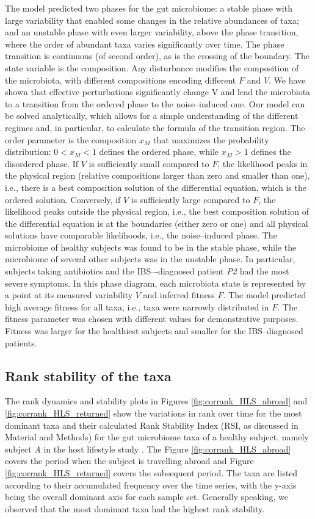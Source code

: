 The model predicted two phases for the gut microbiome: a stable phase with large variability that enabled some changes in the relative abundances of taxa; and an unstable phase with even larger variability, above the phase transition, where the order of abundant taxa varies significantly over time. The phase transition is continuous (of second order), as is the crossing of the boundary. The state variable is the composition. Any disturbance modifies the composition of the microbiota, with different compositions encoding different $F$ and $V$. We have shown that effective perturbations significantly change V and lead the microbiota to a transition from the ordered phase to the noise--induced one. Our model can be solved analytically, which allows for a simple understanding of the different regimes and, in particular, to calculate the formula of the transition region. The order parameter is the composition $x_M$ that maximizes the probability distribution: $0<x_M<1$ defines the ordered phase, while $x_M>1$ defines the disordered phase. If $V$ is sufficiently small compared to $F$, the likelihood peaks in the physical region (relative compositions larger than zero and smaller than one), i.e., there is a best composition solution of the differential equation, which is the ordered solution. Conversely, if $V$ is sufficiently large compared to $F$, the likelihood peaks outside the physical region, i.e., the best composition solution of the differential equation is at the boundaries (either zero or one) and all physical solutions have comparable likelihoods, i.e., the noise--induced phase. The microbiome of healthy subjects was found to be in the stable phase, while the microbiome of several other subjects was in the unstable phase. In particular, subjects taking antibiotics and the IBS–-diagnosed patient \emph{P2} had the most severe symptoms. In this phase diagram, each microbiota state is represented by a point at its measured variability $V$ and inferred fitness $F$. The model predicted high average fitness for all taxa, i.e., taxa were narrowly distributed in $F$. The fitness parameter was chosen with different values for demonstrative purposes. Fitness was larger for the healthiest subjects and smaller for the IBS--diagnosed patients.

\subsection*{Rank stability of the taxa} 

The rank dynamics and stability plots in Figures \ref{fig:corrank_HLS_abroad} and \ref{fig:corrank_HLS_returned} show the variations in rank over time for the most dominant taxa and their calculated Rank Stability Index (RSI, as discussed in Material and Methods) for the gut microbiome taxa of a healthy subject, namely subject \emph{A} in the host lifestyle study \cite{hostlife}. The Figure \ref{fig:corrank_HLS_abroad} covers the period when the subject is travelling abroad and Figure \ref{fig:corrank_HLS_returned} covers the subsequent period. The taxa are listed according to their accumulated frequency over the time series, with the y-axis being the overall dominant axis for each sample set. Generally speaking, we observed that the most dominant taxa had the highest rank stability. 

